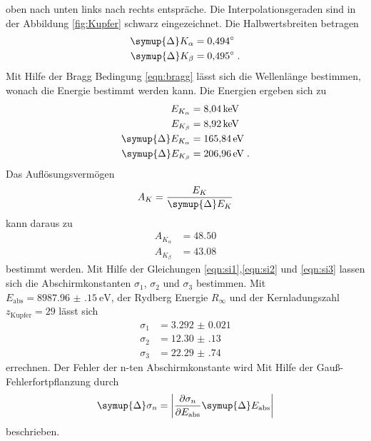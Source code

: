 oben nach unten links nach rechts entspräche.
Die Interpolationsgeraden sind in der Abbildung \ref{fig:Kupfer} schwarz eingezeichnet.
Die Halbwertsbreiten betragen
\begin{align*}
    \symup{\Delta}K_\alpha  &= \ang{0.494;;} \\
    \symup{\Delta}K_\beta   &= \ang{0.495;;} \; \text{.}
\end{align*}
Mit Hilfe der Bragg Bedingung \eqref{eqn:bragg} lässt sich die Wellenlänge bestimmen, wonach die Energie bestimmt werden kann.
Die Energien ergeben sich zu 
\begin{align*}
    E_{K_\alpha} & =  \SI{8.04}{\kilo\electronvolt} \\
    E_{K_\beta}  & =  \SI{8.92}{\kilo\electronvolt} \\
    \symup{\Delta}E_{K_\alpha} &= \SI{165.84}{\electronvolt} \\
    \symup{\Delta}E_{K_\beta}  &= \SI{206.96}{\electronvolt} \; \text{.}
\end{align*}
Das Auflösungsvermögen 
\begin{equation}
    A_K = \frac{E_K}{\symup{\Delta}E_K}
\end{equation}
kann daraus zu 
\begin{align*}
    A_{K_\alpha}&= \num{48.50} \\
    A_{K_\beta} &= \num{43.08}
\end{align*}
bestimmt werden.
Mit Hilfe der Gleichungen \eqref{eqn:si1},\eqref{eqn:si2} und \eqref{eqn:si3} lassen sich die Abschirmkonstanten $\sigma_1$, $\sigma_2$ und $\sigma_3$ bestimmen.
Mit $E_\text{abs} = \SI{8987.96(15)}{\electronvolt}$\cite{eabs}, der Rydberg Energie $R_\infty$ und der Kernladungszahl
$z_\text{Kupfer} = 29 $ lässt sich
\begin{align*}
    \sigma_1 &= \num{3.292(21)}  \\
    \sigma_2 &= \num{12.30(13)}  \\
    \sigma_3 &= \num{22.29(74)}
\end{align*}
errechnen.
Der Fehler der n-ten Abschirmkonstante wird Mit Hilfe der Gauß-Fehlerfortpflanzung durch
\begin{equation}
    \symup{\Delta} \sigma_n = \left | \frac{\partial \sigma_n}{\partial E_\text{abs} } \symup{\Delta} E_\text{abs} \right | 
\end{equation} 
beschrieben.
